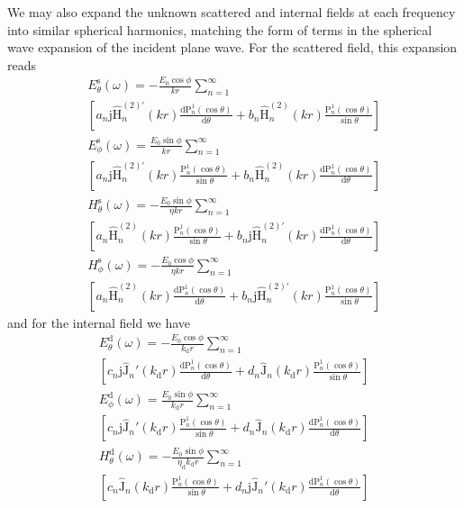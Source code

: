 \documentclass[article]{IEEEtran}
\newcommand{\T}[1]{\mathrm{#1}}
\newcommand{\Jh}{\hat{\T{J}}}
\newcommand{\Hh}{\hat{\T{H}}^{(2)}}
\newcommand{\Hhp}{\hat{\T{H}}^{(2)\prime}}
\begin{document}


We may also expand the unknown scattered and internal fields at each frequency into similar spherical harmonics, matching the form of terms in the spherical wave expansion of the incident plane wave.  For the scattered field, this expansion reads
\begin{multline}
    E_\theta^\T{s}(\omega) = -\frac{E_0\cos\phi}{kr}\sum_{n=1}^\infty\\\left[a_n\T{j}\Hhp_n(kr)\frac{\T{d}\T{P}_n^1(\cos\theta)}{\T{d}\theta}+b_n\Hh_n(kr)\frac{\T{P}_n^1(\cos\theta)}{\sin\theta}\right]
    \label{eq:E-sc-t}
\end{multline}
\begin{multline}
    E_\phi^\T{s}(\omega) = \frac{E_0\sin\phi}{kr}\sum_{n=1}^\infty\\\left[a_n\T{j}\Hhp_n(kr)\frac{\T{P}_n^1(\cos\theta)}{\sin\theta}+b_n\Hh_n(kr)\frac{\T{d}\T{P}_n^1(\cos\theta)}{\T{d}\theta}\right]
    \label{eq:E-sc-p}
\end{multline}
\begin{multline}
    H_\theta^\T{s}(\omega) = -\frac{E_0\sin\phi}{\eta kr}\sum_{n=1}^\infty\\\left[a_n\Hh_n(kr)\frac{\T{P}_n^1(\cos\theta)}{\sin\theta}+b_n\T{j}\Hhp_n(kr)\frac{\T{d}\T{P}_n^1(\cos\theta)}{\T{d}\theta}\right]
    \label{eq:H-sc-t}
\end{multline}
\begin{multline}
    H_\phi^\T{s}(\omega) = -\frac{E_0\cos\phi}{\eta kr}\sum_{n=1}^\infty\\\left[a_n\Hh_n(kr)\frac{\T{d}\T{P}_n^1(\cos\theta)}{\T{d}\theta}+b_n\T{j}\Hhp_n(kr)\frac{\T{P}_n^1(\cos\theta)}{\sin\theta}\right]
    \label{eq:H-sc-p}
\end{multline}
and for the internal field we have
\begin{multline}
    E_\theta^\T{d}(\omega) =  -\frac{E_0\cos\phi}{k_\T{d}r}\sum_{n=1}^\infty\\\left[c_n\T{j}\Jh_n'(k_\T{d}r)\frac{\T{d}\T{P}_n^1(\cos\theta)}{\T{d}\theta}+d_n\Jh_n(k_\T{d}r)\frac{\T{P}_n^1(\cos\theta)}{\sin\theta}\right]
\end{multline}
\begin{multline}
    E_\phi^\T{d}(\omega) = \frac{E_0\sin\phi}{k_\T{d}r}\sum_{n=1}^\infty\\\left[c_n\T{j}\Jh_n'(k_\T{d}r)\frac{\T{P}_n^1(\cos\theta)}{\sin\theta}+d_n\Jh_n(k_\T{d}r)\frac{\T{d}\T{P}_n^1(\cos\theta)}{\T{d}\theta}\right]
\end{multline}
\begin{multline}
    H_\theta^\T{d}(\omega) = -\frac{E_0\sin\phi}{\eta_\T{d}k_\T{d}r}\sum_{n=1}^\infty\\\left[c_n\Jh_n(k_\T{d}r)\frac{\T{P}^1_n(\cos\theta)}{\sin\theta} + d_n\T{j}\Jh_n'(k_\T{d}r)\frac{\T{d}\T{P}_n^1(\cos\theta)}{\T{d}\theta}\right]
\end{multline}
\end{document}

